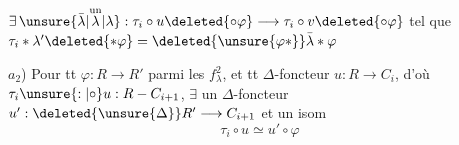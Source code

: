 \deleted{\unsure{$\exists$}} $\exists\,\unsure{\bar\lambda|\overset{\text{un}}{\lambda}|\lambda}:\tau_i\circ u\deleted{\circ\varphi}\longrightarrow\tau_i\circ v\deleted{\circ\varphi}$ tel que $\tau_i*\lambda'\deleted{*\varphi}=\deleted{\unsure{\varphi*}}\bar\lambda*\varphi$

$a_2$) Pour tt $\varphi:R\longrightarrow R'$ parmi les $f^2_\lambda$, et tt $\Delta$-foncteur $u:R\longrightarrow C_i$, \deleted{$\exists$} d'où $\tau_i\unsure{:|\circ}u:R-C_{i+1}$, $\exists$ un $\Delta$-foncteur $u':\deleted{\unsure{\Delta}}R'\longrightarrow C_{i+1}$ et un isom
\[
\tau_i\circ u\simeq u'\circ\varphi
\]

